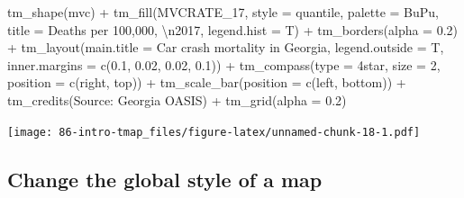 \documentclass[
]{book}
\newenvironment{Shaded}{\begin{snugshade}}{\end{snugshade}}
\newcommand{\AttributeTok}[1]{\textcolor[rgb]{0.77,0.63,0.00}{#1}}
\newcommand{\DecValTok}[1]{\textcolor[rgb]{0.00,0.00,0.81}{#1}}
\newcommand{\FloatTok}[1]{\textcolor[rgb]{0.00,0.00,0.81}{#1}}
\newcommand{\FunctionTok}[1]{\textcolor[rgb]{0.00,0.00,0.00}{#1}}
\newcommand{\NormalTok}[1]{#1}
\newcommand{\SpecialCharTok}[1]{\textcolor[rgb]{0.00,0.00,0.00}{#1}}
\newcommand{\StringTok}[1]{\textcolor[rgb]{0.31,0.60,0.02}{#1}}
\begin{document}
\begin{Shaded}
\begin{Highlighting}[]
\FunctionTok{tm\_shape}\NormalTok{(mvc) }\SpecialCharTok{+}
  \FunctionTok{tm\_fill}\NormalTok{(}\StringTok{\textquotesingle{}MVCRATE\_17\textquotesingle{}}\NormalTok{,}
          \AttributeTok{style =} \StringTok{\textquotesingle{}quantile\textquotesingle{}}\NormalTok{,}
          \AttributeTok{palette =} \StringTok{\textquotesingle{}BuPu\textquotesingle{}}\NormalTok{,}
          \AttributeTok{title =} \StringTok{\textquotesingle{}Deaths per 100,000, }\SpecialCharTok{\textbackslash{}n}\StringTok{2017\textquotesingle{}}\NormalTok{,}
          \AttributeTok{legend.hist =}\NormalTok{ T) }\SpecialCharTok{+}
  \FunctionTok{tm\_borders}\NormalTok{(}\AttributeTok{alpha =} \FloatTok{0.2}\NormalTok{) }\SpecialCharTok{+}
  \FunctionTok{tm\_layout}\NormalTok{(}\AttributeTok{main.title =} \StringTok{\textquotesingle{}Car crash mortality in Georgia\textquotesingle{}}\NormalTok{,}
            \AttributeTok{legend.outside =}\NormalTok{ T, }
            \AttributeTok{inner.margins =} \FunctionTok{c}\NormalTok{(}\FloatTok{0.1}\NormalTok{, }\FloatTok{0.02}\NormalTok{, }\FloatTok{0.02}\NormalTok{, }\FloatTok{0.1}\NormalTok{)) }\SpecialCharTok{+}
  \FunctionTok{tm\_compass}\NormalTok{(}\AttributeTok{type =} \StringTok{\textquotesingle{}4star\textquotesingle{}}\NormalTok{, }
             \AttributeTok{size =} \DecValTok{2}\NormalTok{,}
             \AttributeTok{position =} \FunctionTok{c}\NormalTok{(}\StringTok{\textquotesingle{}right\textquotesingle{}}\NormalTok{, }\StringTok{\textquotesingle{}top\textquotesingle{}}\NormalTok{)) }\SpecialCharTok{+}
  \FunctionTok{tm\_scale\_bar}\NormalTok{(}\AttributeTok{position =} \FunctionTok{c}\NormalTok{(}\StringTok{\textquotesingle{}left\textquotesingle{}}\NormalTok{, }\StringTok{\textquotesingle{}bottom\textquotesingle{}}\NormalTok{)) }\SpecialCharTok{+}
  \FunctionTok{tm\_credits}\NormalTok{(}\StringTok{\textquotesingle{}Source: Georgia OASIS\textquotesingle{}}\NormalTok{) }\SpecialCharTok{+}
  \FunctionTok{tm\_grid}\NormalTok{(}\AttributeTok{alpha =} \FloatTok{0.2}\NormalTok{)}
\end{Highlighting}
\end{Shaded}

\texttt{[image: 86-intro-tmap\_files/figure-latex/unnamed-chunk-18-1.pdf]}

\hypertarget{change-the-global-style-of-a-map}{%
\subsection{Change the global style of a map}\label{change-the-global-style-of-a-map}}
\end{document}
